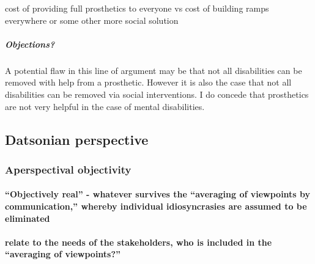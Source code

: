 \documentclass[a4paper]{article}
\begin{document}
cost of providing full prosthetics to everyone vs cost of building ramps
everywhere or some other more social solution

\subparagraph{Objections?}

A potential flaw in this line of argument may be that not all disabilities can
be removed with help from a prosthetic. However it is also the case that not
all disabilities can be removed via social interventions. I do concede that
prosthetics are not very helpful in the case of mental disabilities. 


\subsection{Datsonian perspective}

\subsubsection{Aperspectival objectivity}

\paragraph{``Objectively real'' - whatever survives the ``averaging of viewpoints
by communication,'' whereby individual idiosyncrasies are assumed to be
eliminated}

\paragraph{relate to the needs of the stakeholders, who is included in the
``averaging of viewpoints?''}




\cleardoublepage


%
%

\end{document}

